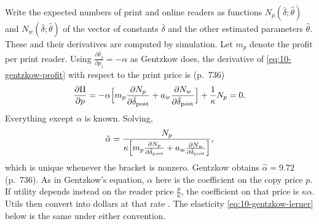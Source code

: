  Write the expected numbers of print and online readers as functions $N_p(\bar
\delta; \hat\theta)$ and $N_w(\bar\delta; \hat\theta)$ of the vector of constants $\bar\delta$ and the other estimated
parameters $\hat\theta$. These and their derivatives are computed by simulation. Let $m_p$ denote the profit per print
reader. Using $\frac{\partial\bar\delta_j}{\partial p_j} = -\alpha$ as Gentzkow does, the derivative of \eqref{eq:10-gentzkow-profit}
with respect to the print price is (p.~736)
\begin{equation}\label{eq:10-gentzkow-foc}
  \frac{\partial\Pi}{\partial p} = -\alpha\Bigl[m_p\frac{\partial N_p}{\partial\bar\delta_{\mathrm{post}}}
  + a_w\frac{\partial N_w}{\partial\bar\delta_{\mathrm{post}}}\Bigr] + \frac{1}{\kappa}N_p = 0 .
\end{equation}
Everything except $\alpha$ is known. Solving,
\begin{equation}\label{eq:10-gentzkow-alpha}
  \hat\alpha = \frac{N_p}{\kappa\Bigl[m_p\frac{\partial N_p}{\partial\bar\delta_{\mathrm{post}}}
  + a_w\frac{\partial N_w}{\partial\bar\delta_{\mathrm{post}}}\Bigr]} ,
\end{equation}
which is unique whenever the bracket is nonzero. Gentzkow obtains $\hat\alpha = 9.72$ (p.~736). As in Gentzkow's
equation, $\alpha$ here is the coefficient on the copy price $p$. If utility depends instead on the reader price
$\frac{p}{\kappa}$, the coefficient on that price is $\kappa\alpha$. Utils then convert into dollars at that rate
\citep[n.~28]{Gentzkow2007}. The elasticity \eqref{eq:10-gentzkow-lerner} below is the same under either
convention.

